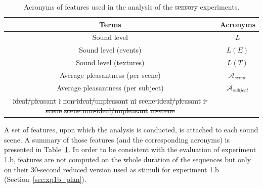\documentclass[12pt]{elsarticle}
\newcommand{\cf}{cf.}
\providecommand{\DIFdel}[1]{{\protect\color{red}\sout{#1}}}                      %
\providecommand{\DIFdelFL}[1]{\DIFdel{#1}} %
\providecommand{\DIFdelbeginFL}{} %
\providecommand{\DIFdelendFL}{} %
\begin{document}
\begin{table}[t]
\centering
\begin{tabular}{c c}
Terms                              & Acronyms                   \\
\hline
Sound level                        & $L$                        \\
Sound level (events)               & $L(E)$                     \\
Sound level (textures)             & $L(T)$                     \\
Average pleasantness (per scene)   & $\mathcal{A}_{scene}$      \\
Average pleasantness (per subject) & $\mathcal{A}_{subject}$      \\
\DIFdelbeginFL %
\DIFdelFL{ideal/pleasant                     }%
\DIFdelFL{i                          }%
\DIFdelFL{non-ideal/unpleasant               }%
\DIFdelFL{ni                         }%
\DIFdelFL{scene ideal/pleasant               }%
\DIFdelFL{i-scene                    }%
\DIFdelFL{scene non-ideal/unpleasant         }%
\DIFdelFL{ni-scene                   }%
\DIFdelendFL \hline
\end{tabular}
\vspace{0.5mm}
\caption{Acronyms of features used in the analysis of the \DIFdelbeginFL \DIFdelFL{sensory }\DIFdelendFL experiments.}
\label{tab:acronyme}
\end{table}


A set of features, upon which the analysis is conducted, is attached to each sound scene. A summary of those features (and the corresponding acronyms) is presented in Table~\ref{tab:acronyme}. In order to be consistent with the evaluation of experiment 1.b, features are not computed on the whole duration of the sequences but only on their 30-second reduced version used as stimuli for experiment 1.b (Section~\ref{sec:xp1b_plan}).
\end{document}
